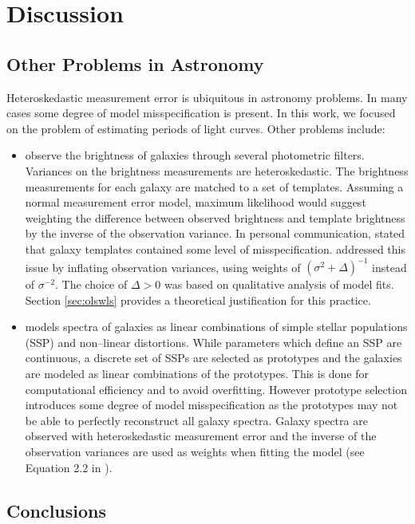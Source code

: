 \documentclass[ejs,ps,preprint]{imsart}
\numberwithin{equation}{section}
\theoremstyle{plain}
\begin{document}
\section{Discussion}
\label{sec:discussion}

\subsection{Other Problems in Astronomy}

Heteroskedastic measurement error is ubiquitous in astronomy problems. In many cases some degree of model misspecification is present. In this work, we focused on the problem of estimating periods of light curves. Other problems include:
\begin{itemize}
\item \cite{salmon2015relation} observe the brightness of galaxies through several photometric filters. Variances on the brightness measurements are heteroskedastic. The brightness measurements for each galaxy are matched to a set of templates. Assuming a normal measurement error model, maximum likelihood would suggest weighting the difference between observed brightness and template brightness by the inverse of the observation variance. In personal communication, \cite{salmon2015relation} stated that galaxy templates contained some level of misspecification. \cite{salmon2015relation} addressed this issue by inflating observation variances, using weights of $(\sigma^2 + \Delta)^{-1}$ instead of $\sigma^{-2}$. The choice of $\Delta > 0$ was based on qualitative analysis of model fits. Section \ref{sec:olswls} provides a theoretical justification for this practice.
\item \cite{richards2012prototype} models spectra of galaxies as linear combinations of simple stellar populations (SSP) and non--linear distortions. While parameters which define an SSP are continuous, a discrete set of SSPs are selected as prototypes and the galaxies are modeled as linear combinations of the prototypes. This is done for computational efficiency and to avoid overfitting. However prototype selection introduces some degree of model misspecification as the prototypes may not be able to perfectly reconstruct all galaxy spectra. Galaxy spectra are observed with heteroskedastic measurement error and the inverse of the observation variances are used as weights when fitting the model (see Equation 2.2 in \cite{richards2012prototype}).
\end{itemize}

\subsection{Conclusions}
\end{document}
